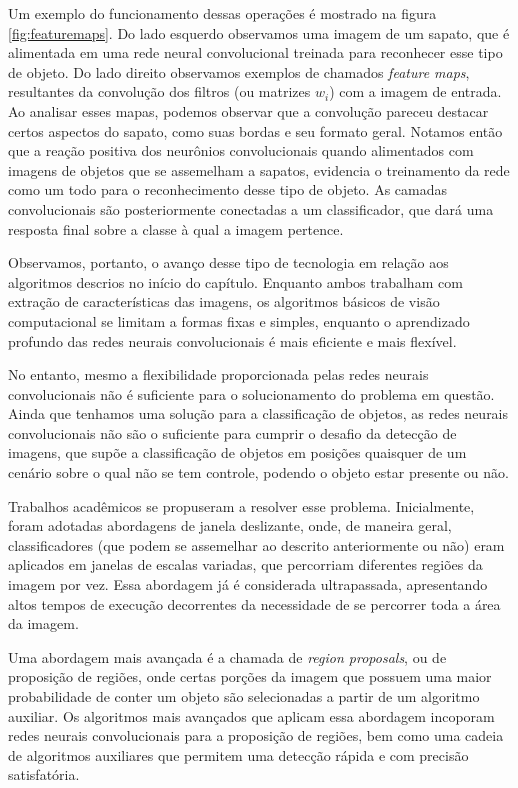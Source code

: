 \documentclass[]{politex}
\begin{document}
Um exemplo do funcionamento dessas operações é mostrado na figura \ref{fig:featuremaps}. Do lado esquerdo observamos uma imagem de um sapato, que é alimentada em uma rede neural convolucional treinada para reconhecer esse tipo de objeto. Do lado direito observamos exemplos de chamados \textit{feature maps}, resultantes da convolução dos filtros (ou matrizes $\mathit{w_{i}}$) com a imagem de entrada. Ao analisar esses mapas, podemos observar que a convolução pareceu destacar certos aspectos do sapato, como suas bordas e seu formato geral. Notamos então que a reação positiva dos neurônios convolucionais quando alimentados com imagens de objetos que se assemelham a sapatos, evidencia o treinamento da rede como um todo para o reconhecimento desse tipo de objeto. As camadas convolucionais são posteriormente conectadas a um classificador, que dará uma resposta final sobre a classe à qual a imagem pertence.

Observamos, portanto, o avanço desse tipo de tecnologia em relação aos algoritmos descrios no início do capítulo. Enquanto ambos trabalham com extração de características das imagens, os algoritmos básicos de visão computacional se limitam a formas fixas e simples, enquanto o aprendizado profundo das redes neurais convolucionais é mais eficiente e mais flexível.

No entanto, mesmo a flexibilidade proporcionada pelas redes neurais convolucionais não é suficiente para o solucionamento do problema em questão. Ainda que tenhamos uma solução para a classificação de objetos, as redes neurais convolucionais não são o suficiente para cumprir o desafio da detecção de imagens, que supõe a classificação de objetos em posições quaisquer de um cenário sobre o qual não se tem controle, podendo o objeto estar presente ou não.

Trabalhos acadêmicos se propuseram a resolver esse problema. Inicialmente, foram adotadas abordagens de janela deslizante, onde, de maneira geral, classificadores (que podem se assemelhar ao descrito anteriormente ou não) eram aplicados em janelas de escalas variadas, que percorriam diferentes regiões da imagem por vez. Essa abordagem já é considerada ultrapassada, apresentando altos tempos de execução decorrentes da necessidade de se percorrer toda a área da imagem.

Uma abordagem mais avançada é a chamada de \textit{region proposals}, ou de proposição de regiões, onde certas porções da imagem que possuem uma maior probabilidade de conter um objeto são selecionadas a partir de um algoritmo auxiliar. Os algoritmos mais avançados que aplicam essa abordagem incoporam redes neurais convolucionais para a proposição de regiões, bem como uma cadeia de algoritmos auxiliares que permitem uma detecção rápida e com precisão satisfatória.
\end{document}
